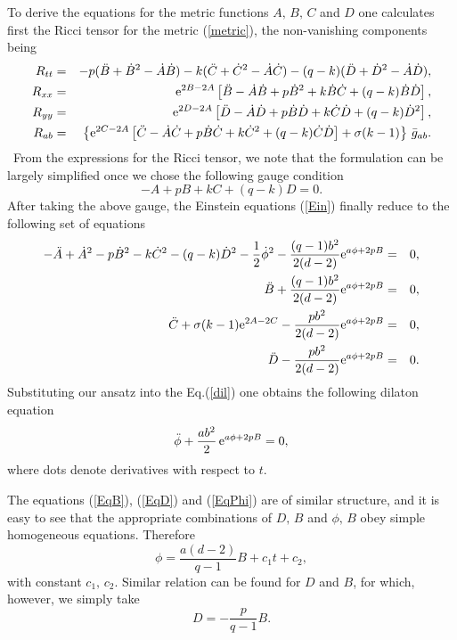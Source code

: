 \documentclass[a4paper,aps,nofootinbib,showpacs,preprint]{revtex4}
\begin{document}
To derive the equations for the metric functions $A,\,B,\,C$ and
$D$ one calculates first the Ricci tensor for the metric
(\ref{metric}), the non-vanishing components being
\begin{eqnarray}
R_{tt} &=& - p (\ddot B + \dot B^2 - \dot A \dot B) - k (\ddot C
+ \dot C^2 - \dot A \dot C) - (q-k) (\ddot D + \dot D^2 - \dot A
\dot D), \\
R_{xx} &=& {\rm e}^{2B-2A} \left[ \ddot B - \dot A \dot B + p \dot
B^2 + k \dot B \dot C + (q-k) \dot B \dot D \right], \label{Rxx}\\
R_{yy} &=& {\rm e}^{2D-2A} \left[ \ddot D - \dot A \dot D + p \dot
B \dot D + k \dot C \dot D + (q-k) \dot D^2 \right], \label{Ryy}\\
R_{ab} &=&  \left\{ {\rm e}^{2C-2A} \left[ \ddot C - \dot A \dot C
+ p \dot B \dot C + k \dot C^2 + (q-k) \dot C \dot D \right] +
\sigma (k-1) \right\} \, \bar g_{ab}. \label{Rab}
\end{eqnarray}
\ From the expressions for the Ricci tensor, we note that the
formulation can be largely simplified once we chose the following
gauge condition
\begin{equation}\label{gauge}
- A + p B + k C + (q-k) D = 0.
\end{equation}
After taking the above gauge, the Einstein equations (\ref{Ein})
finally reduce to the following set of equations
\begin{eqnarray}
- \ddot A  + \dot A^2 - p \dot B^2 - k \dot C^2 -(q-k) \dot D^2 -
\frac12 \dot \phi^2 - \frac{(q-1)b^2}{2(d-2)} {\rm e}^{a\phi+2pB}
&=& 0, \label{EqA} \\
\ddot B + \frac{(q-1) b^2}{2(d-2)} {\rm e}^{a\phi+2pB} &=& 0,
\label{EqB} \\
\ddot C + \sigma (k-1) {\rm e}^{2A-2C} - \frac{p b^2}{2(d-2)} {\rm
e}^{a\phi+2pB} &=& 0, \label{EqC} \\
\ddot D - \frac{p b^2}{2(d-2)} {\rm e}^{a\phi+2pB} &=& 0.
\label{EqD}
\end{eqnarray}
Substituting our ansatz into the Eq.(\ref{dil}) one obtains the
following dilaton equation
\begin{equation}\label{EqPhi}
\ddot \phi + \frac{a b^2}2 \, {\rm e}^{a\phi+2pB} = 0,
\end{equation}
where dots denote derivatives with respect to $t$.

The equations (\ref{EqB}), (\ref{EqD}) and (\ref{EqPhi}) are of
similar structure, and it is easy to see that the appropriate
combinations of $D,\, B$ and $\phi,\, B$ obey simple homogeneous
equations. Therefore
\begin{equation}
\phi = \frac{a(d-2)}{q-1} B + c_1 t + c_2,
\end{equation}
with constant $c_1,\, c_2$. Similar relation can be found for $D$
and $B$, for which, however, we simply take
\begin{equation}
D = -\frac{p}{q-1} B.
\end{equation}
\end{document}
